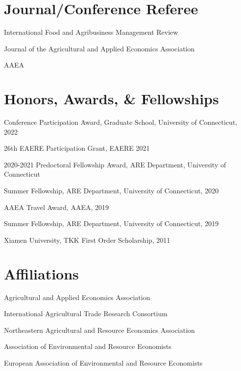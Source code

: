 \documentclass[11 pt,letterpaper]{article}
\renewenvironment{itemize}{
	\begin{list}{}{
			\setlength{\leftmargin}{1.5em}
		}
	}{
	\end{list}
}
\begin{document}
	
	
	\section*{\textbf{Journal/Conference Referee}}
	
	\begin{itemize}
		\item[-]  International Food and Agribusiness Management Review
		\item[-] Journal of the Agricultural and Applied Economics Association
		\item[-]  AAEA
	\end{itemize}
	
	\section*{\textbf{Honors, Awards, \& Fellowships}}
	
	\begin{itemize}
		\item[-] Conference Participation Award, Graduate School, University of Connecticut, 2022
		\item[-] 26th EAERE Participation Grant, EAERE 2021
		\item[-] 2020-2021 Predoctoral Fellowship Award, ARE Department, University of Connecticut
		\item[-]  Summer  Fellowship, ARE Department, University of Connecticut, 2020
		\item[-] AAEA Travel Award, AAEA, 2019
		\item[-]  Summer  Fellowship, ARE Department, University of Connecticut, 2019
		\item[-] Xiamen University, TKK First Order Scholarship, 2011
		
	\end{itemize}
	
	
		\section*{\textbf{Affiliations}}
	\begin{itemize}
		\item[-] Agricultural and Applied Economics Association
		\item[-] International Agricultural Trade Research Consortium
		\item[-] Northeastern Agricultural and Resource Economics Association
		\item[-] Association of Environmental and Resource Economists
		\item[-] European Association of Environmental and Resource Economists
		
	\end{itemize}
	
\end{document}
